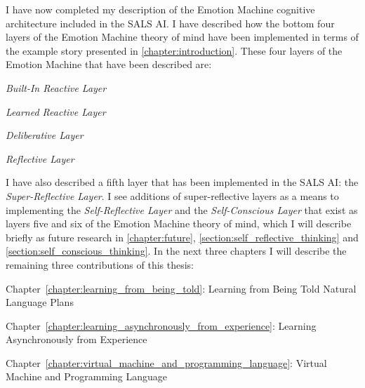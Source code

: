I have now completed my description of the Emotion Machine cognitive
architecture included in the SALS AI.  I have described how the bottom
four layers of the Emotion Machine theory of mind have been
implemented in terms of the example story presented in
{\mbox{\autoref{chapter:introduction}}}.  These four layers of the
Emotion Machine that have been described are:
\begin{packed_enumerate}
\item{\emph{Built-In Reactive Layer}}
\item{\emph{Learned Reactive Layer}}
\item{\emph{Deliberative Layer}}
\item{\emph{Reflective Layer}}
\end{packed_enumerate}
I have also described a fifth layer that has been implemented in the
SALS AI: the {\emph{Super-Reflective Layer}}.  I see additions of
super-reflective layers as a means to implementing the
{\emph{Self-Reflective Layer}} and the {\emph{Self-Conscious Layer}}
that exist as layers five and six of the Emotion Machine theory of
mind, which I will describe briefly as future research in
{\mbox{\autoref{chapter:future}}},
{\mbox{\autoref{section:self_reflective_thinking}}} and
{\mbox{\autoref{section:self_conscious_thinking}}}.  In the next three
chapters I will describe the remaining three contributions of this
thesis:
\begin{packed_itemize}
\item{{\mbox{Chapter~\ref{chapter:learning_from_being_told}}}: Learning from Being Told Natural Language Plans}
\item{{\mbox{Chapter~\ref{chapter:learning_asynchronously_from_experience}}}: Learning Asynchronously from Experience}
\item{{\mbox{Chapter~\ref{chapter:virtual_machine_and_programming_language}}}: Virtual Machine and Programming Language}
\end{packed_itemize}
